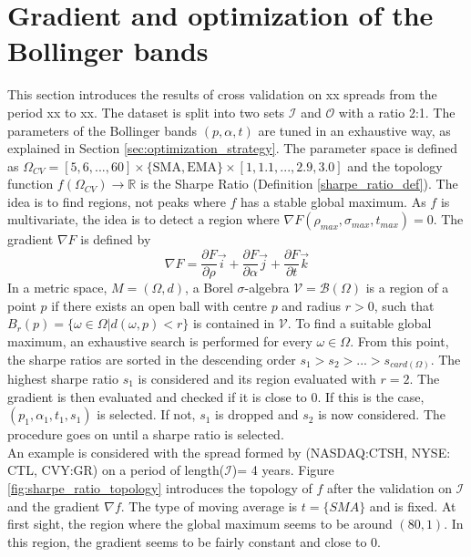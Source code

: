 \documentclass[11pt,a4,twosided,singlespacing,titlepagenumber=on]{scrreprt}
\numberwithin{equation}{chapter} %
\theoremstyle{remark}
\begin{document}
\section{Gradient and optimization of the Bollinger bands}
This section introduces the results of cross validation on xx spreads from the period xx to xx. The dataset is split into two sets $\mathcal{I}$ and $\mathcal{O}$ with a ratio 2:1. The parameters of the Bollinger bands $(p, \alpha, t)$ are tuned in an exhaustive way, as explained in Section \ref{sec:optimization_strategy}. The parameter space is defined as $\Omega_{CV}  = [5,6,...,60] \times \{\text{SMA}, \text{EMA}\} \times [1,1.1,...,2.9,3.0]$ and the topology function $f(\Omega_{CV}) \rightarrow \mathbb{R}$ is the Sharpe Ratio (Definition \ref{sharpe_ratio_def}). The idea is to find regions, not peaks where $f$ has a stable global maximum. As $f$ is multivariate, the idea is to detect a region where $\nabla F(\rho_{max}, \sigma_{max}, t_{max}) = 0$. The gradient $\nabla F$ is defined by
\begin{equation}
\nabla F = \frac{\partial F}{\partial \rho} \vec{i} + \frac{\partial F}{\partial \alpha} \vec{j} + \frac{\partial F}{\partial t} \vec{k}
\end{equation}
In a metric space, $M = (\Omega, d)$, a Borel $\sigma$-algebra $\mathcal{V} = \mathcal{B}(\Omega)$ is a region of a point $p$ if there exists an open ball with centre $p$ and radius $r > 0$, such that $B_r(p) = \{\omega \in \Omega | d(\omega, p) < r\}$ is contained in $\mathcal{V}$. To find a suitable global maximum, an exhaustive search is performed for every $\omega \in \Omega$. From this point, the sharpe ratios are sorted in the descending order $s_1 > s_2 > ... > s_{card(\Omega)}$. The highest sharpe ratio $s_1$ is considered and its region evaluated with $r=2$. The gradient is then evaluated and checked if it is close to 0. If this is the case, $(p_1, \alpha_1, t_1, s_1)$ is selected. If not, $s_1$ is dropped and $s_2$ is now considered. The procedure goes on until a sharpe ratio is selected. \\
An example is considered with the spread formed by (NASDAQ:CTSH, NYSE: CTL, CVY:GR) on a period of length($\mathcal{I}$)= 4 years. Figure \ref{fig:sharpe_ratio_topology} introduces the topology of $f$ after the validation on $\mathcal{I}$ and the gradient $\nabla f$. The type of moving average is $t = \{ SMA \}$ and is fixed. At first sight, the region where the global maximum seems to be around $(80,1)$. In this region, the gradient seems to be fairly constant and close to 0.
\end{document}
